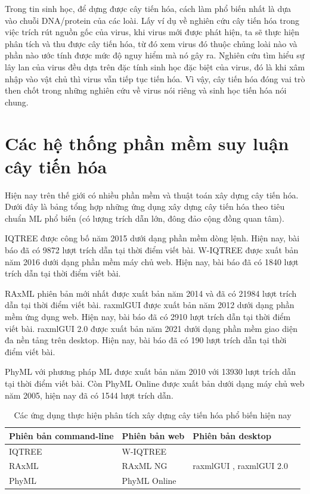 \documentclass[12pt]{report}
\begin{document}
Trong tin sinh học, để dựng được cây tiến hóa, cách làm phổ biến nhất là dựa vào chuỗi DNA/protein của các loài. Lấy ví dụ về nghiên cứu cây tiến hóa trong việc trích rút nguồn gốc của virus, khi virus mới được phát hiện, ta sẽ thực hiện phân tích và thu được cây tiến hóa, từ đó xem virus đó thuộc chủng loài nào và phần nào ước tính được mức độ nguy hiểm mà nó gây ra. Nghiên cứu tìm hiểu sự lây lan của virus đều dựa trên đặc tính sinh học đặc biệt của virus, đó là khi xâm nhập vào vật chủ thì virus vẫn tiếp tục tiến hóa. Vì vậy, cây tiến hóa đóng vai trò then chốt trong những nghiên cứu về virus nói riêng và sinh học tiến hóa nói chung. 
\section{Các hệ thống phần mềm suy luận cây tiến hóa }
Hiện nay trên thế giới có nhiều phần mềm và thuật toán xây dựng cây tiến hóa. Dưới đây là bảng tổng hợp những ứng dụng xây dựng cây tiến hóa theo tiêu chuẩn ML phổ biến (có lượng trích dẫn lớn, đông đảo cộng đồng quan tâm). 

IQTREE được công bố năm 2015 dưới dạng phần mềm dòng lệnh. Hiện nay, bài báo đã có 9872 lượt trích dẫn tại thời điểm viết bài. W-IQTREE được xuất bản năm 2016 dưới dạng phần mềm máy chủ web. Hiện nay, bài báo đã có 1840 lượt trích dẫn tại thời điểm viết bài.

RAxML phiên bản mới nhất được xuất bản năm 2014 và đã có 21984 lượt trích dẫn tại thời điểm viết bài. raxmlGUI được xuất bản năm 2012 dưới dạng phần mềm ứng dụng web. Hiện nay, bài báo đã có 2910 lượt trích dẫn tại thời điểm viết bài. raxmlGUI 2.0 được xuất bản năm 2021 dưới dạng phần mềm giao diện đa nền tảng trên desktop. Hiện nay, bài báo đã có 190 lượt trích dẫn tại thời điểm viết bài.

PhyML với phương pháp ML được xuất bản năm 2010 với 13930 lượt trích dẫn tại thời điểm viết bài. Còn PhyML Online được xuất bản dưới dạng máy chủ web năm 2005, hiện nay đã có 1544 lượt trích dẫn.

\begin{table}[h]
	\centering
	\caption{Các ứng dụng thực hiện phân tích xây dựng cây tiến hóa phổ biến hiện nay}
	\label{tbl:table1.1}
	\begin{tabular}{|p{3cm}|l|l|l|}
		\hline
		\textbf{Phiên bản command-line} & \textbf{Phiên bản web} & \textbf{Phiên bản desktop} \\ \hline
		IQTREE \cite{cia-3}              & W-IQTREE \cite{cia-4}        &                                  \\ \hline
		RAxML \cite{cia-5}             &   RAxML NG \cite{cia-5.5}    &           raxmlGUI \cite{cia-6},   raxmlGUI 2.0 \cite{cia-7}                    \\ \hline
		PhyML \cite{cia-8}             & PhyML Online \cite{cia-9}    &                                  \\ \hline
	\end{tabular}
\end{table}
\end{document}
